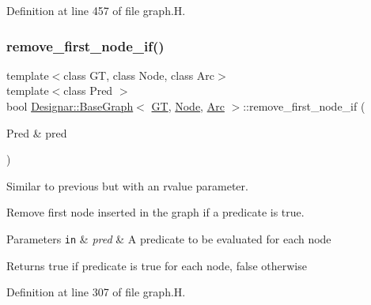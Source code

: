 Definition at line 457 of file graph.\+H.

\mbox{\label{class_designar_1_1_base_graph_a1311af417ba4d373d7051b73cc2696ec}} 
\subsubsection{\texorpdfstring{remove\+\_\+first\+\_\+node\+\_\+if()}{remove\_first\_node\_if()}\hspace{0.1cm}{\footnotesize\ttfamily [1/2]}}
{\footnotesize\ttfamily template$<$class GT, class Node, class Arc$>$ \\
template$<$class Pred $>$ \\
bool \hyperlink{class_designar_1_1_base_graph}{Designar\+::\+Base\+Graph}$<$ \hyperlink{demo-buildgraph_8_c_a3001c40d2c31ca87ed96cd7d1334a55e}{GT}, \hyperlink{namespace_designar_a5af326c65aa2bd26b26c410f2030d09e}{Node}, \hyperlink{namespace_designar_a3f55fb5513d62ff47cbc8f72b8e95d6f}{Arc} $>$\+::remove\+\_\+first\+\_\+node\+\_\+if (\begin{DoxyParamCaption}\item[{Pred \&}]{pred }\end{DoxyParamCaption})\hspace{0.3cm}{\ttfamily [inline]}}



Similar to previous but with an rvalue parameter. 

Remove first node inserted in the graph if a predicate is true.


\begin{DoxyParams}[1]{Parameters}
\mbox{\tt in}  & {\em pred} & A predicate to be evaluated for each node \\
\hline
\end{DoxyParams}
\begin{DoxyReturn}{Returns}
{\ttfamily true} if predicate is true for each node, {\ttfamily false} otherwise 
\end{DoxyReturn}


Definition at line 307 of file graph.\+H.

\mbox{\label{class_designar_1_1_base_graph_aec049416b5240910cb04b1d6f55fcecf}} 
